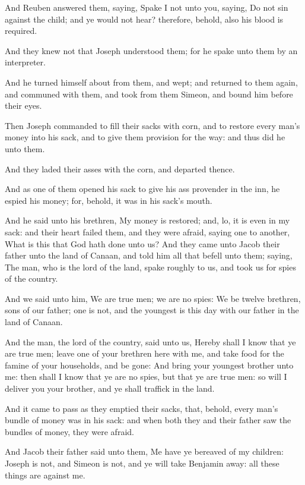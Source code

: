\verse And Reuben answered them, saying, Spake I not unto you, saying, Do not sin against the child; and ye would not hear? therefore, behold, also his blood is required.

\verse And they knew not that Joseph understood them; for he spake unto them by an interpreter.

\verse And he turned himself about from them, and wept; and returned to them again, and communed with them, and took from them Simeon, and bound him before their eyes.

\verse Then Joseph commanded to fill their sacks with corn, and to restore every man's money into his sack, and to give them provision for the way: and thus did he unto them.

\verse And they laded their asses with the corn, and departed thence.

\verse And as one of them opened his sack to give his ass provender in the inn, he espied his money; for, behold, it was in his sack's mouth.

\verse And he said unto his brethren, My money is restored; and, lo, it is even in my sack: and their heart failed them, and they were afraid, saying one to another, What is this that God hath done unto us?  \verse And they came unto Jacob their father unto the land of Canaan, and told him all that befell unto them; saying, \verse The man, who is the lord of the land, spake roughly to us, and took us for spies of the country.

\verse And we said unto him, We are true men; we are no spies: \verse We be twelve brethren, sons of our father; one is not, and the youngest is this day with our father in the land of Canaan.

\verse And the man, the lord of the country, said unto us, Hereby shall I know that ye are true men; leave one of your brethren here with me, and take food for the famine of your households, and be gone: \verse And bring your youngest brother unto me: then shall I know that ye are no spies, but that ye are true men: so will I deliver you your brother, and ye shall traffick in the land.

\verse And it came to pass as they emptied their sacks, that, behold, every man's bundle of money was in his sack: and when both they and their father saw the bundles of money, they were afraid.

\verse And Jacob their father said unto them, Me have ye bereaved of my children: Joseph is not, and Simeon is not, and ye will take Benjamin away: all these things are against me.

